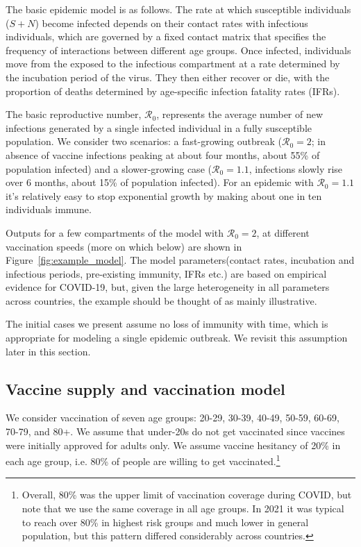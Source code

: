 \documentclass[12pt]{article}
\begin{document}
The basic epidemic model is as follows. The rate at which susceptible individuals ($S + N$) become infected depends on their contact rates with infectious individuals, which are governed by a fixed contact matrix that specifies the frequency of interactions between different age groups. Once infected, individuals move from the exposed to the infectious compartment at a rate determined by the incubation period of the virus. They then either recover or die, with the proportion of deaths determined by age-specific infection fatality rates (IFRs). 

The basic reproductive number, $\mathcal{R}_0$, represents the average number of new infections generated by a single infected individual in a fully susceptible population. We consider two scenarios: a fast-growing outbreak ($\mathcal{R}_0 = 2$; in absence of vaccine infections peaking at about four months, about 55\% of population infected) and a slower-growing case ($\mathcal{R}_0 = 1.1$, infections slowly rise over 6 months, about 15\% of population infected). For an epidemic with $\mathcal{R}_0 = 1.1$ it's relatively easy to stop exponential growth by making about one in ten individuals immune.

Outputs for a few compartments of the model with $\mathcal{R}_0 = 2$, at different vaccination speeds (more on which below) are shown in Figure~\ref{fig:example_model}. The model parameters(contact rates, incubation and infectious periods, pre-existing immunity, IFRs etc.) are based on empirical evidence for COVID-19, but, given the large heterogeneity in all parameters across countries, the example should be thought of as mainly illustrative. 

The initial cases we present assume no loss of immunity with time, which is appropriate for modeling a single epidemic outbreak. We revisit this assumption later in this section.



\subsection{Vaccine supply and vaccination model}

We consider vaccination of seven age groups: 20-29, 30-39, 40-49, 50-59, 60-69, 70-79, and 80+. We assume that under-20s do not get vaccinated since vaccines were initially approved for adults only. We assume vaccine hesitancy of 20\% in each age group, i.e. 80\% of people are willing to get vaccinated.\footnote{Overall, 80\% was the upper limit of vaccination coverage during COVID, but note that we use the same coverage in all age groups. In 2021 it was typical to reach over 80\% in highest risk groups and much lower in general population, but this pattern differed considerably across countries.}
\end{document}
